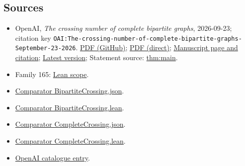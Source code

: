 \documentclass[11pt]{article}
\begin{document}
\subsection{Sources}
\begin{itemize}
\item OpenAI, \emph{The crossing number of complete bipartite graphs}, 2026-09-23; citation key \texttt{OAI:The-crossing-number-of-complete-bipartite-graphs-September-23-2026}. \href{https://github.com/openai/math/blob/adc7f1241b42e322a6451854ab7e4b4c146bf78a/preprints/The-crossing-number-of-complete-bipartite-graphs-September-23-2026/paper.pdf}{PDF (GitHub)}; \href{https://github.com/openai/math/raw/adc7f1241b42e322a6451854ab7e4b4c146bf78a/preprints/The-crossing-number-of-complete-bipartite-graphs-September-23-2026/paper.pdf}{PDF (direct)}; \href{https://github.com/openai/math/blob/adc7f1241b42e322a6451854ab7e4b4c146bf78a/preprints/The-crossing-number-of-complete-bipartite-graphs-September-23-2026/README.md}{Manuscript page and citation}; \href{https://github.com/openai/math/blob/main/preprints/The-crossing-number-of-complete-bipartite-graphs-September-23-2026/paper.pdf}{Latest version}; Statement source: \href{https://github.com/openai/math/blob/adc7f1241b42e322a6451854ab7e4b4c146bf78a/preprints/The-crossing-number-of-complete-bipartite-graphs-September-23-2026/build/sections/introduction.tex\#L29}{thm:main}.
\item Family 165: \href{https://github.com/openai/math/blob/adc7f1241b42e322a6451854ab7e4b4c146bf78a/lean/docs/165.md}{Lean scope}.
\item \href{https://github.com/openai/math/blob/adc7f1241b42e322a6451854ab7e4b4c146bf78a/lean/ComparatorChallenges/BipartiteCrossing.json}{Comparator BipartiteCrossing.json}.
\item \href{https://github.com/openai/math/blob/adc7f1241b42e322a6451854ab7e4b4c146bf78a/lean/ComparatorChallenges/BipartiteCrossing.lean}{Comparator BipartiteCrossing.lean}.
\item \href{https://github.com/openai/math/blob/adc7f1241b42e322a6451854ab7e4b4c146bf78a/lean/ComparatorChallenges/CompleteCrossing.json}{Comparator CompleteCrossing.json}.
\item \href{https://github.com/openai/math/blob/adc7f1241b42e322a6451854ab7e4b4c146bf78a/lean/ComparatorChallenges/CompleteCrossing.lean}{Comparator CompleteCrossing.lean}.
\item \href{https://github.com/openai/math/blob/adc7f1241b42e322a6451854ab7e4b4c146bf78a/CONTENTS.md}{OpenAI catalogue entry}.
\end{itemize}
\end{document}
